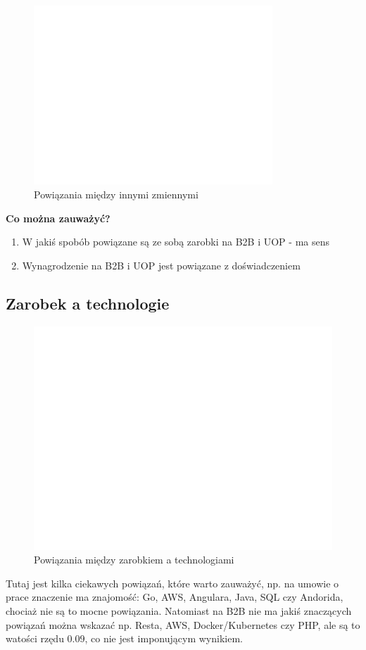 \documentclass{article}
\begin{document}
\begin{figure}[H]
    \centering
    \includegraphics[width=0.8\textwidth]{../analysis/plots/korelacje/Korelacja między zmiennymi.png}
    \caption{Powiązania między innymi zmiennymi}
\end{figure}

\quad \textbf{Co można zauważyć?}

\begin{enumerate}
    \item W jakiś spobób powiązane są ze sobą zarobki na B2B i UOP - ma sens
    \item Wynagrodzenie na B2B i UOP jest powiązane z doświadczeniem
\end{enumerate}


\subsection{Zarobek a technologie}

\begin{figure}[H]
    \centering
    \includegraphics[width=\textwidth]{../analysis/plots/korelacje/Zarobki a technologie.png}
    \caption{Powiązania między zarobkiem a technologiami}
\end{figure}

\quad Tutaj jest kilka ciekawych powiązań, które warto zauważyć, np. na umowie o prace znaczenie ma
znajomość: Go, AWS, Angulara, Java, SQL czy Andorida, chociaż nie są to mocne powiązania. Natomiast na B2B nie ma jakiś znaczących powiązań można wskazać
np. Resta, AWS, Docker/Kubernetes czy PHP, ale są to watości rzędu 0.09, co nie jest imponującym wynikiem.
\end{document}
